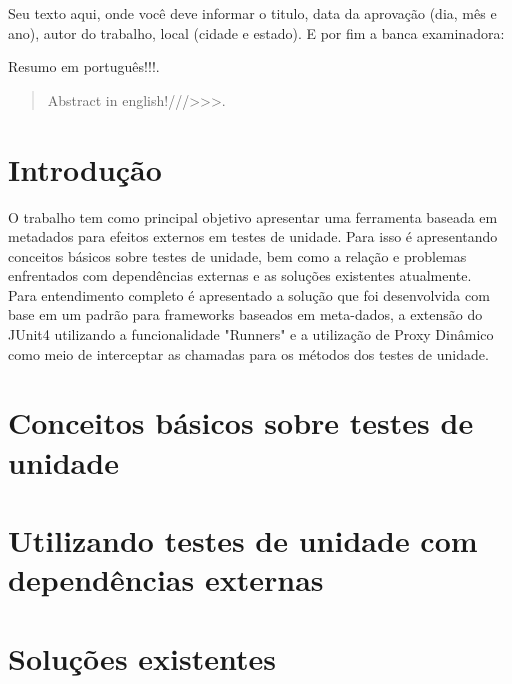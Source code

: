 \documentclass{abnt}
\begin{document}
\capa
\folhaderosto

\setlength{\ABNTsignthickness}{1pt}
\begin{folhadeaprovacao}
	Seu texto aqui, onde você deve informar o titulo, data da aprovação (dia, mês e ano), autor do trabalho, local (cidade e estado). E por fim a banca examinadora:
\end{folhadeaprovacao}

\begin{resumo}
	Resumo em português!!!.
\end{resumo}

\begin{abstract}
	Abstract in english!///>>>.
\end{abstract}

\sumario
\listoffigures

\chapter{Introdução} 
O trabalho tem como principal objetivo apresentar uma ferramenta baseada em metadados para efeitos externos em testes de unidade. Para isso é apresentando conceitos básicos sobre testes de unidade, bem como a relação e problemas enfrentados com dependências externas e as soluções existentes atualmente.\\
Para entendimento completo é apresentado a solução que foi desenvolvida com base em um padrão para frameworks baseados em meta-dados, a extensão do JUnit4 utilizando a funcionalidade "Runners" e a utilização de Proxy Dinâmico como meio de interceptar as chamadas para os métodos dos testes de unidade.\\

\chapter{Conceitos básicos sobre testes de unidade}



\chapter{Utilizando testes de unidade com dependências externas} 
\chapter{Soluções existentes}
\end{document}
